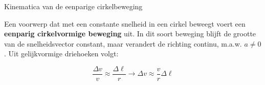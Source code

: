 \begin{theo}{Kinematica van de eenparige cirkelbeweging}
    \vspace{-0.4cm}
    \begin{minipage}{.71\textwidth}
        Een voorwerp dat met een constante snelheid in een cirkel beweegt voert een \textbf{eenparig cirkelvormige beweging} uit. In dit soort beweging blijft de grootte van de snelheidsvector constant, maar verandert de richting continu, m.a.w. $ a \neq 0 $. Uit gelijkvormige driehoeken volgt: 
    
        \begin{equation*}
            \dfrac{\Delta v}{v} \approx \dfrac{\Delta \ell}{r} \to \Delta v \approx \dfrac{v}{r}\Delta \ell
        \end{equation*}

        

\end{minipage}
\end{theo}
